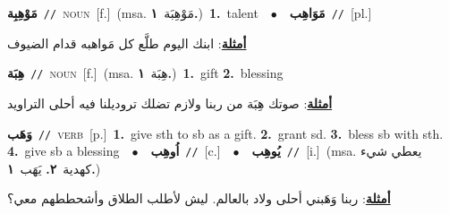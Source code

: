 \documentclass[10pt,a4paper,twoside]{article} %
\begin{document}
\begin{multicols}{2}
{\setlength\topsep{0pt}\textbf{\foreignlanguage{arabic}{مَوْهِبِة}}\ {\color{gray}\texttt{//}\color{black}}\ \textsc{noun}\ [f.]\ \color{gray}(msa. \foreignlanguage{arabic}{مَوْهِبَة}~\foreignlanguage{arabic}{\textbf{١.}})\color{black}\ \textbf{1.}~talent\ \ $\bullet$\ \ \setlength\topsep{0pt}\textbf{\foreignlanguage{arabic}{مَوَاهِب}}\ {\color{gray}\texttt{//}\color{black}}\ [pl.]\  \begin{flushright}\color{gray}\foreignlanguage{arabic}{\textbf{\underline{\foreignlanguage{arabic}{أمثلة}}}: ابنك اليوم طلَّع كل مَواهبه قدام الضيوف}\end{flushright}\color{black}} \vspace{2mm}

{\setlength\topsep{0pt}\textbf{\foreignlanguage{arabic}{هِبَة}}\ {\color{gray}\texttt{//}\color{black}}\ \textsc{noun}\ [f.]\ \color{gray}(msa. \foreignlanguage{arabic}{هِبَة}~\foreignlanguage{arabic}{\textbf{١.}})\color{black}\ \textbf{1.}~gift  \textbf{2.}~blessing\  \begin{flushright}\color{gray}\foreignlanguage{arabic}{\textbf{\underline{\foreignlanguage{arabic}{أمثلة}}}: صوتك هِبَة من ربنا ولازم تضلك تروديلنا فيه أحلى التراويد}\end{flushright}\color{black}} \vspace{2mm}

{\setlength\topsep{0pt}\textbf{\foreignlanguage{arabic}{وَهَب}}\ {\color{gray}\texttt{//}\color{black}}\ \textsc{verb}\ [p.]\ \textbf{1.}~give sth to sb as a gift.  \textbf{2.}~grant sd.  \textbf{3.}~bless sb with sth.  \textbf{4.}~give sb a blessing\ \ $\bullet$\ \ \setlength\topsep{0pt}\textbf{\foreignlanguage{arabic}{اُوهِب}}\ {\color{gray}\texttt{//}\color{black}}\ [c.]\ \ $\bullet$\ \ \setlength\topsep{0pt}\textbf{\foreignlanguage{arabic}{يُوهِب}}\ {\color{gray}\texttt{//}\color{black}}\ [i.]\ \color{gray}(msa. \foreignlanguage{arabic}{يعطي شيء كهدية}~\foreignlanguage{arabic}{\textbf{٢.}}  \foreignlanguage{arabic}{يَهَب}~\foreignlanguage{arabic}{\textbf{١.}})\color{black}\  \begin{flushright}\color{gray}\foreignlanguage{arabic}{\textbf{\underline{\foreignlanguage{arabic}{أمثلة}}}: ربنا وَهَبني أحلى ولاد بالعالم. ليش لأطلب الطلاق وأشحططهم معي؟}\end{flushright}\color{black}} \vspace{2mm}


\end{multicols}
\end{document}

